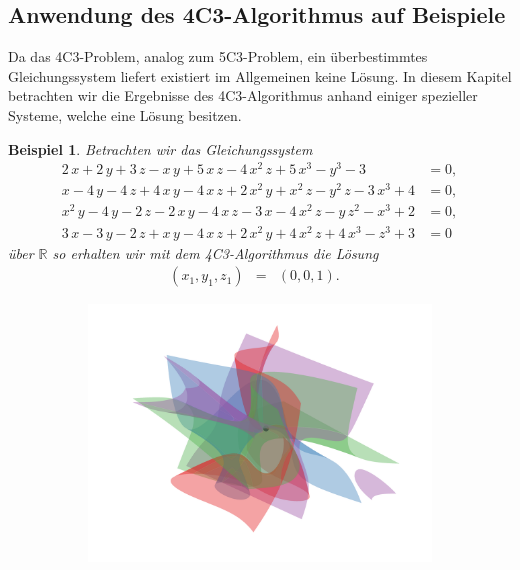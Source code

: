 \documentclass[a4paper,oneside, 11pt, openany%
]{article}
\newcommand{\R}{{\mathbb R}}
\theoremstyle{custom}
\theoremstyle{custom}
\newtheorem{example}{Beispiel}[section]
\begin{document}
\subsection{Anwendung des 4C3-Algorithmus auf Beispiele}
Da das 4C3-Problem, analog zum 5C3-Problem, ein überbestimmtes Gleichungssystem liefert existiert im Allgemeinen keine Lösung. In diesem Kapitel betrachten wir die Ergebnisse des 4C3-Algorithmus anhand einiger spezieller Systeme, welche eine Lösung besitzen.
\begin{example}\label{ex:4C3_1}
	Betrachten wir das Gleichungssystem
	\begin{equation}\label{eqn:example4C3_1}
		\begin{alignedat}{-1}
2\,x+2\,y+3\,z-x\,y+5\,x\,z-4\,x^2\,z+5\,x^3-y^3-3&=0,\\ x-4\,y-4\,z+4\,x\,y-4\,x\,z+2\,x^2\,y+x^2\,z-y^2\,z-3\,x^3+4&=0,\\ x^2\,y-4\,y-2\,z-2\,x\,y-4\,x\,z-3\,x-4\,x^2\,z-y\,z^2-x^3+2&=0,\\ 3\,x-3\,y-2\,z+x\,y-4\,x\,z+2\,x^2\,y+4\,x^2\,z+4\,x^3-z^3+3&=0
		\end{alignedat}
	\end{equation}
	über $\R$ so erhalten wir mit dem 4C3-Algorithmus die Lösung
	\begin{equation*}
		\begin{alignedat}{5}
			&\left( x_{1},y_{1},z_{1}\right) &=& \left(0, 0, 1 \right).&&
		\end{alignedat}
	\end{equation*}
\end{example}
	\begin{figure}[H]
\begin{subfigure}[b]{0.8\textwidth}
			\includegraphics[width=\textwidth]{"images/e4c3_example1.png"}
\end{subfigure}
	\end{figure}
\end{document}
